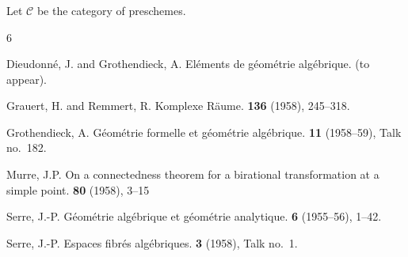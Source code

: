 \documentclass{article}
\theoremstyle{plain}
\theoremstyle{definition}
\newenvironment{example}[1]
  {\renewcommand\theinnercustomexample{#1}\innercustomexample}
  {\endinnercustomexample}
\newcommand{\cat}[1]{{\mathcal{#1}}}
\begin{document}
\subsubsection{}
\label{A.4.e}

\begin{example}{2}
  Let $\cat{C}$ be the category of preschemes.
\end{example}




\nocite{*}
\begin{thebibliography}{6}

  {\sc Dieudonn\'{e}, J. and Grothendieck, A.}
  \newblock El\'{e}ments de g\'{e}om\'{e}trie alg\'{e}brique.
   (to appear).

  {\sc Grauert, H. and Remmert, R.}
  \newblock Komplexe R\"{a}ume.
   \textbf{136} (1958), 245--318.

  {\sc Grothendieck, A.}
  \newblock G\'{e}om\'{e}trie formelle et g\'{e}om\'{e}trie alg\'{e}brique.
   \textbf{11} (1958--59), Talk no.~182.

  {\sc Murre, J.P.}
  \newblock On a connectedness theorem for a birational transformation at a simple point.
   \textbf{80} (1958), 3--15

  {\sc Serre, J.-P.}
  \newblock G\'{e}om\'{e}trie alg\'{e}brique et g\'{e}om\'{e}trie analytique.
   \textbf{6} (1955--56), 1--42.

  {\sc Serre, J.-P.}
  \newblock Espaces fibr\'{e}s alg\'{e}briques.
   \textbf{3} (1958), Talk no.~1.

\end{thebibliography}
\end{document}
